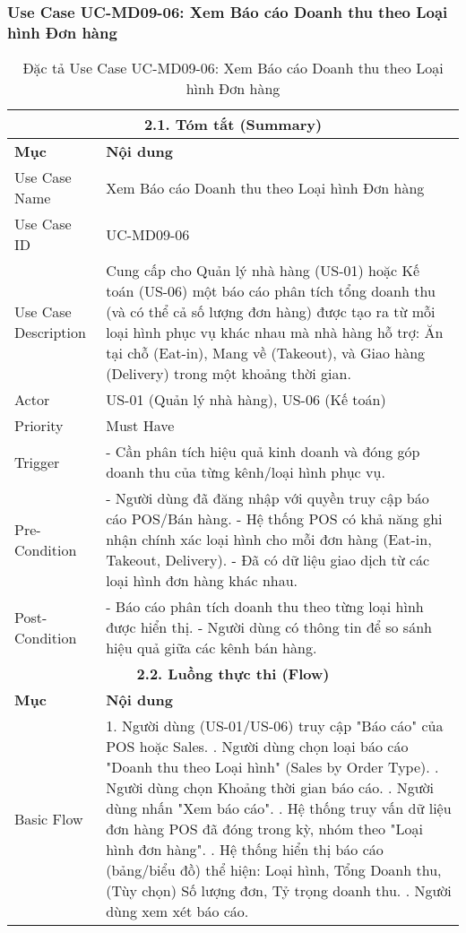 \subsubsection{Use Case UC-MD09-06: Xem Báo cáo Doanh thu theo Loại hình Đơn hàng}
\begin{longtable}{|m{4cm}|p{11cm}|}
\caption{Đặc tả Use Case UC-MD09-06: Xem Báo cáo Doanh thu theo Loại hình Đơn hàng} \label{tab:uc_md09_06_corrected} \\
\hline
\multicolumn{2}{|c|}{\textbf{2.1. Tóm tắt (Summary)}} \\
\hline
\textbf{Mục} & \textbf{Nội dung} \\
\hline
\endhead %
\midrule
\endfoot %
\bottomrule
\endlastfoot %
Use Case Name & Xem Báo cáo Doanh thu theo Loại hình Đơn hàng \\
\hline
Use Case ID & UC-MD09-06 \\
\hline
Use Case Description & Cung cấp cho Quản lý nhà hàng (US-01) hoặc Kế toán (US-06) một báo cáo phân tích tổng doanh thu (và có thể cả số lượng đơn hàng) được tạo ra từ mỗi loại hình phục vụ khác nhau mà nhà hàng hỗ trợ: Ăn tại chỗ (Eat-in), Mang về (Takeout), và Giao hàng (Delivery) trong một khoảng thời gian. \\
\hline
Actor & US-01 (Quản lý nhà hàng), US-06 (Kế toán) \\
\hline
Priority & Must Have \\
\hline
Trigger & - Cần phân tích hiệu quả kinh doanh và đóng góp doanh thu của từng kênh/loại hình phục vụ. \\
\hline
Pre-Condition & - Người dùng đã đăng nhập với quyền truy cập báo cáo POS/Bán hàng. \newline - Hệ thống POS có khả năng ghi nhận chính xác loại hình cho mỗi đơn hàng (Eat-in, Takeout, Delivery). \newline - Đã có dữ liệu giao dịch từ các loại hình đơn hàng khác nhau. \\
\hline
Post-Condition & - Báo cáo phân tích doanh thu theo từng loại hình được hiển thị. \newline - Người dùng có thông tin để so sánh hiệu quả giữa các kênh bán hàng. \\
\hline
\multicolumn{2}{|c|}{\textbf{2.2. Luồng thực thi (Flow)}} \\
\hline
\textbf{Mục} & \textbf{Nội dung} \\
\hline
Basic Flow & 1. Người dùng (US-01/US-06) truy cập "Báo cáo" của POS hoặc Sales. \newline 2. Người dùng chọn loại báo cáo "Doanh thu theo Loại hình" (Sales by Order Type). \newline 3. Người dùng chọn Khoảng thời gian báo cáo. \newline 4. Người dùng nhấn "Xem báo cáo". \newline 5. Hệ thống truy vấn dữ liệu đơn hàng POS đã đóng trong kỳ, nhóm theo "Loại hình đơn hàng". \newline 6. Hệ thống hiển thị báo cáo (bảng/biểu đồ) thể hiện: Loại hình, Tổng Doanh thu, (Tùy chọn) Số lượng đơn, Tỷ trọng doanh thu. \newline 7. Người dùng xem xét báo cáo. \\

\end{longtable}
